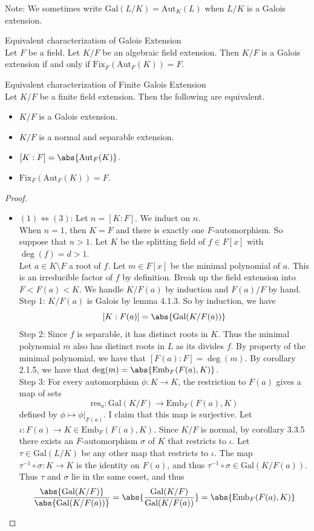 \documentclass[a4paper]{article}
\begin{document}
Note: We sometimes write $\text{Gal}(L/K)=\text{Aut}_K(L)$ when $L/K$ is a Galois extension. 

\begin{prp}{Equivalent characterization of Galois Extension}{}\\
Let $F$ be a field. Let $K/F$ be an algebraic field extension. Then $K/F$ is a Galois extension if and only if $\text{Fix}_F(\text{Aut}_F(K))=F$. 
\end{prp}

\begin{prp}{Equivalent characterization of Finite Galois Extension}{}\\
Let $K/F$ be a finite field extension. Then the following are equivalent. 
\begin{itemize}
\item $K/F$ is a Galois extension. 
\item $K/F$ is a normal and separable extension. 
\item $[K:F]=\abs{\text{Aut}_F(K)}$. 
\item $\text{Fix}_F(\text{Aut}_F(K))=F$. 
\end{itemize} 
\begin{proof}~\\
\begin{itemize}
\item $(1)\iff(3)$: Let $n=[K:F]$. We induct on $n$. \\
When $n=1$, then $K=F$ and there is exactly one $F$-automorphism. So suppose that $n>1$. Let $K$ be the splitting field of $f\in F[x]$ with $\deg(f)=d>1$. \\
Let $a\in K\setminus F$ a root of $f$. Let $m\in F[x]$ be the minimal polynomial of $a$. This is an irreducible factor of $f$ by definition. Break up the field extension into $F<F(a)<K$. We handle $K/F(a)$ by induction and $F(a)/F$ by hand. \\
Step 1: $K/F(a)$ is Galois by lemma 4.1.3. So by induction, we have $$[K:F(a)]=\abs{\text{Gal}(K/F(a))}$$
Step 2: Since $f$ is separable, it has distinct roots in $K$. Thus the minimal polynomial $m$ also has distinct roots in $L$ as its divides $f$. By property of the minimal polynomial, we have that $[F(a):F]=\deg(m)$. By corollary 2.1.5, we have that $\deg(m)=\abs{\text{Emb}_F(F(a),K)}$. \\
Step 3: For every automorphism $\phi:K\to K$, the restriction to $F(a)$ gives a map of sets $$\text{res}_a:\text{Gal}(K/F)\to\text{Emb}_F(F(a),K)$$ defined by $\phi\mapsto\phi|_{F(a)}$. I claim that this map is surjective. Let $\iota:F(a)\to K\in\text{Emb}_F(F(a),K)$. Since $K/F$ is normal, by corollary 3.3.5 there exists an $F$-automorphism $\sigma$ of $K$ that restricts to $\iota$. Let $\tau\in\text{Gal}(L/K)$ be any other map that restricts to $\iota$. The map $\tau^{-1}\circ\sigma:K\to K$ is the identity on $F(a)$, and thus $\tau^{-1}\circ\sigma\in\text{Gal}(K/F(a))$. Thus $\tau$ and $\sigma$ lie in the same coset, and thus $$\frac{\abs{\text{Gal}(K/F)}}{\abs{\text{Gal}(K/F(a))}}=\abs{\frac{\text{Gal}(K/F)}{\text{Gal}(K/F(a))}}=\abs{\text{Emb}_F(F(a),K)}$$

\end{itemize}
\end{proof}
\end{prp}
\end{document}
